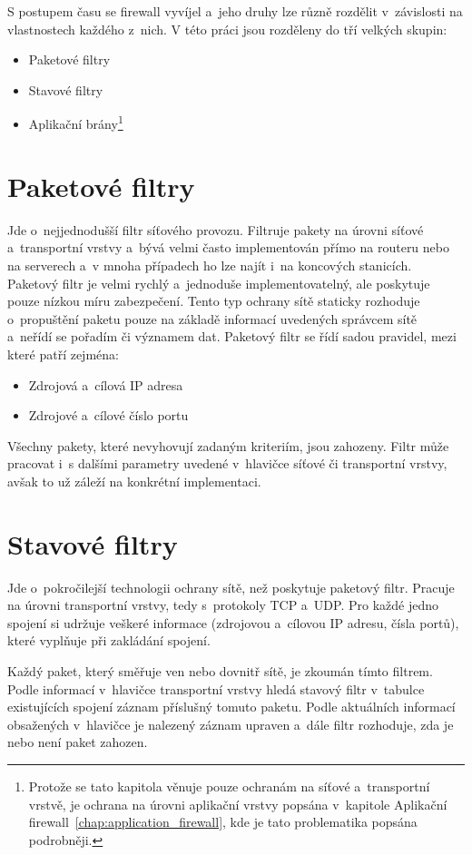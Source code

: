 S postupem času se firewall vyvíjel a~jeho druhy lze různě rozdělit v~závislosti na vlastnostech každého z~nich. V této práci jsou rozděleny \cite{bib:firewall} do tří velkých skupin: 
\begin{itemize}
	\item Paketové filtry
	\item Stavové filtry
	\item Aplikační brány\footnote{Protože se tato kapitola věnuje pouze ochranám na síťové a~transportní vrstvě, je ochrana na úrovni aplikační vrstvy popsána v~kapitole Aplikační firewall~\ref{chap:application_firewall}, kde je tato problematika popsána podrobněji.}
\end{itemize}

\section{Paketové filtry}
Jde o~nejjednodušší filtr síťového provozu. Filtruje pakety na úrovni síťové a~transportní vrstvy a~bývá velmi často implementován přímo na routeru nebo na serverech a~v mnoha případech ho lze najít i~na koncových stanicích. Paketový filtr je velmi rychlý a~jednoduše implementovatelný, ale poskytuje pouze nízkou míru zabezpečení. Tento typ ochrany sítě staticky rozhoduje o~propuštění paketu pouze na základě informací uvedených správcem sítě a~neřídí se pořadím či významem dat. Paketový filtr se řídí sadou pravidel, mezi které patří zejména:
\begin{itemize}
	\item Zdrojová a~cílová IP adresa
	\item Zdrojové a~cílové číslo portu
\end{itemize}
Všechny pakety, které nevyhovují zadaným kriteriím, jsou zahozeny. Filtr může pracovat i~s dalšími parametry uvedené v~hlavičce síťové či transportní vrstvy, avšak to už záleží na konkrétní implementaci.

\section{Stavové filtry}
Jde o~pokročilejší technologii ochrany sítě, než poskytuje paketový filtr. Pracuje na úrovni transportní vrstvy, tedy s~protokoly TCP a~UDP. Pro každé jedno spojení si udržuje veškeré informace (zdrojovou a~cílovou IP adresu, čísla portů), které vyplňuje při zakládání spojení.

Každý paket, který směřuje ven nebo dovnitř sítě, je zkoumán tímto filtrem. Podle informací v~hlavičce transportní vrstvy hledá stavový filtr v~tabulce existujících spojení záznam příslušný tomuto paketu. Podle aktuálních informací obsažených v~hlavičce je nalezený záznam upraven a~dále filtr rozhoduje, zda je nebo není paket zahozen.

